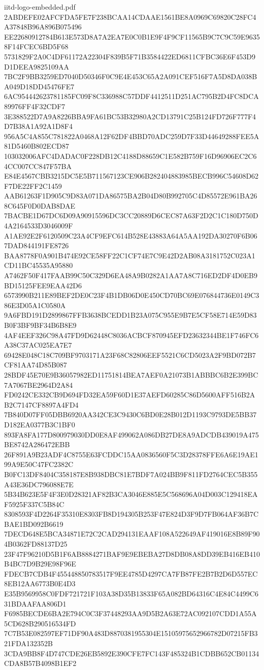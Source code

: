 \begin{filecontents*}[overwrite]{iitd-logo-embedded.pdf}
2ABDEFE02AFCFDA5FE7F238BCAA14CDAAE1561BE8A0969C69820C28FC4A37848B96A896B075496
EE22680912784B613E573D8A7A2EA7E0C0B1E9F4F9CF11565B9C7C9C59E96358F14FCEC6BD5F68
5731829F2A0C4DF61172A22304F839B5F71B3584422ED6811CFBC36E6F453D9D1DEEA9825109AA
7BC2F9BB3259ED7040D50346F0C9E4E453C65A2A091CEF516F7A5D8DA038BA049D18DD45476FE7
6AC954442623781185FC09F8C336988C57DDF4412511D251AC795B2D4FC8DCA89976FF4F32CDF7
3E388522D7A9A8226BBA9FA61BC53B32980A2CD13791C25B124FD726F777F4D7B38A1A92A1D8F4
956A5C4A855C781822A0468A12F62DF4BBD70ADC259D7F33D44649288FEE5A81D5460B802ECD87
103032006AFC4DADAC0F228DB12C4188D88659C1E582B759F16D96906EC2C64CC007CC847F57BA
E84E4567CBB3215DC5E5B711567123CE906B282404883985BECB996C54608D62F7DE22FF2C1459
AAB61263F1D905C9D83A071DA86575BA2B04D80B992705C4D85572E961BA268C645F0D0DAB8DAE
7BACBE1D67DC6D09A90915596DC3CC20889D6CEC87A63F2D2C1C180D750D4A2164533D3046009F
A1AE92E2F6120509C23A4CF9EFC614B528E43883A64A5AA192DA30270F6B067DAD844191FE8726
BAA8778F0A901B474E92CE58FF22C1CF74E7C9E42D2AB08A3181752C023A1CD11BC45535A95880
A7462F50F417FAAB99C50C329D6EA48A9B0282A1AA7A8C716ED2DF4D0EB9BD15125FEE9EAA42D6
6573990B211E89BEF2DE0C23F4B1DB06D0E450CD70BC69E076844736E0149C386E3D05A1C0580A
9A6FBD191D2899867FFB3638BCEDD1B23A075C955E9B7E5CF58E714E59D83B0F3BF9BF34B6B8E9
4AF4EEF326C98A47FD9D62448C8036ACBCF870945EFD23632344BE1F746FC6A38C37AC025EA7E7
69428E048C18C709BF9703171A23F68C82806EEF5521C6CD5023A2F9BD072B7CF81AA74D85B087
28BDF45E70E9B36057982ED11751814BEA7AEF0A21073B1ABBBC6B2E399BC7A7067BE2964D2A84
FD0242CE332CB9D694FD32EA59F60D1E37AEFD60285C86D5600AFF516B2AB2C7147CF8897A4FD4
7B840D07FF05DBB6920AA342CE3C9430C6BD0E28B012D1193C9793DE5BB37D182EA0377B3C1BF0
893FA8FA177D800979030DD0E8AF499062A086DB27DE8A9ADCDB439019A475BE8742A286472EBB
26F891A9B23ADF4C8755E63FCDDC15AA0836560F5C3D28378FFE6A6E19AE199A9E50C47FC2382C
B0FC13DF8404C358187E8B938DBC81E7BDF7A024BB9F811FD2764CEC5B355A43E36DC796088E7E
5B34B623E5F4F3E0D28321AF82B3CA3046E885E5C568696A04D003C129418EAF5925F337C5B84C
8308593F4D2264F35310E8303FB8D194305B253F47E824D3F9D7FB064AF36B7CBAE1BD092B6619
7DECD648E5BCA34871E72C2CAD294131EAAF108A522649AF419016E8B89F904B0362FD88137D25
23F47F96210D5B1F6AB8884271BAF9E9EBEBA27D8DB08A8DD39EB416EB410B4BC7D9B29E98F96E
FDECB7CDB4F455448850783517F9EE4785D4297CA7FB87FE2B7B2D6D557EC8EB12AA6773B0E4D3
E35B9569958C0FDF721721F103A38D35B13833F65A082BD64316C4E84C4499C631BDAAFAA806D1
F6985BECDE6BA2E794C0C3F37448293AA9D5B2A63E72AC092107CDD1A55A5CD628B290516534FD
7C7B53E082597EF71DF90A483D8870381955304E15105975652966782D07215FB321FDA132352B
3CDA9BB8F4D747CDE26EB5892E390CFE7FC143F485324B1CDBB652CB01134CDA8B57B4098B1EF2

\end{filecontents*}
